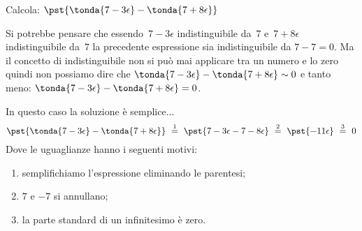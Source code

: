 \begin{esempio}
Calcola: \quad \(\pst{\tonda{7 -3\epsilon} - \tonda{7 +8\epsilon}}\)

\begin{osservazione}
 Si potrebbe pensare che essendo~\(7 -3\epsilon\) indistinguibile da~\(7\) 
e~\(7 +8\epsilon\) indistinguibile da~\(7\) la precedente espressione 
sia indistinguibile da \(7 - 7 = 0\).
Ma il concetto di indistinguibile non si può mai applicare tra un numero e 
lo zero quindi non possiamo dire che 
\(\tonda{7 -3\epsilon} - \tonda{7 +8\epsilon} \sim 0\) e 
tanto meno: \(\tonda{7 -3\epsilon} - \tonda{7 +8\epsilon} = 0\).
\end{osservazione}

In questo caso la soluzione è semplice...
\[\pst{\tonda{7 -3\epsilon} - \tonda{7 +8\epsilon}}
~ \stackrel{1}{=} ~
   \pst{7 -3\epsilon -7 -8\epsilon} 
~ \stackrel{2}{=} ~
   \pst{-11 \epsilon}
~ \stackrel{3}{=} ~ 0\]
Dove le uguaglianze hanno i seguenti motivi:
\begin{enumerate} [nosep]
 \item semplifichiamo l'espressione eliminando le parentesi; 
 \item \(7\) e \(-7\) si annullano; 
 \item la parte standard di un infinitesimo è zero.
\end{enumerate}
\end{esempio}

\pagebreak %

